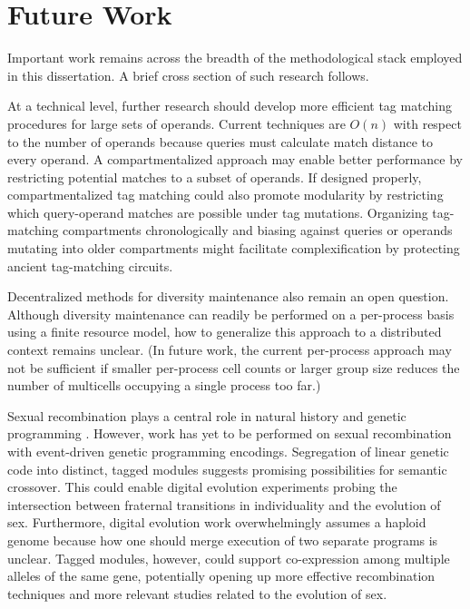 \section{Future Work}

Important work remains across the breadth of the methodological stack employed in this dissertation.
A brief cross section of such research follows.

At a technical level, further research should develop more efficient tag matching procedures for large sets of operands.
Current techniques are $O(n)$ with respect to the number of operands because queries must calculate match distance to every operand.
A compartmentalized approach may enable better performance by restricting potential matches to a subset of operands.
If designed properly, compartmentalized tag matching could also promote modularity by restricting which query-operand matches are possible under tag mutations.
Organizing tag-matching compartments chronologically and biasing against queries or operands mutating into older compartments might facilitate complexification by protecting ancient tag-matching circuits.

Decentralized methods for diversity maintenance also remain an open question.
Although diversity maintenance can readily be performed on a per-process basis using a finite resource model, how to generalize this approach to a distributed context remains unclear.
(In future work, the current per-process approach may not be sufficient if smaller per-process cell counts or larger group size reduces the number of multicells occupying a single process too far.)

Sexual recombination plays a central role in natural history \citep{smith1997major} and genetic programming \citep{o2009riccardo}.
However, work has yet to be performed on sexual recombination with event-driven genetic programming encodings.
Segregation of linear genetic code into distinct, tagged modules suggests promising possibilities for semantic crossover.
This could enable digital evolution experiments probing the intersection between fraternal transitions in individuality and the evolution of sex.
Furthermore, digital evolution work overwhelmingly assumes a haploid genome because how one should merge execution of two separate programs is unclear.
Tagged modules, however, could support co-expression among multiple alleles of the same gene, potentially opening up more effective recombination techniques and more relevant studies related to the evolution of sex.

